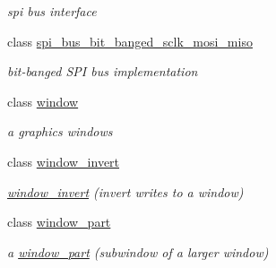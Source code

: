 \begin{DoxyCompactItemize}
\begin{DoxyCompactList}\small\item\em spi bus interface \end{DoxyCompactList}\item 
class \hyperlink{classhwlib_1_1spi__bus__bit__banged__sclk__mosi__miso}{spi\+\_\+bus\+\_\+bit\+\_\+banged\+\_\+sclk\+\_\+mosi\+\_\+miso}
\begin{DoxyCompactList}\small\item\em bit-\/banged S\+PI bus implementation \end{DoxyCompactList}\item 
class \hyperlink{classhwlib_1_1window}{window}
\begin{DoxyCompactList}\small\item\em a graphics windows \end{DoxyCompactList}\item 
class \hyperlink{classhwlib_1_1window__invert}{window\+\_\+invert}
\begin{DoxyCompactList}\small\item\em \hyperlink{classhwlib_1_1window__invert}{window\+\_\+invert} (invert writes to a window) \end{DoxyCompactList}\item 
class \hyperlink{classhwlib_1_1window__part}{window\+\_\+part}
\begin{DoxyCompactList}\small\item\em a \hyperlink{classhwlib_1_1window__part}{window\+\_\+part} (subwindow of a larger window) \end{DoxyCompactList}\end{DoxyCompactItemize}
